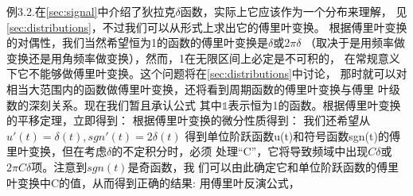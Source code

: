 \documentclass{ctexbook}
\begin{document}
\noindent 例3.2.在\ref{sec:signal}中介绍了狄拉克$\delta$函数，实际上它应该作为一个分布来理解，
见\ref{sec:distributions}，不过我们可以从形式上求出它的傅里叶变换。
根据傅里叶变换的对偶性，我们当然希望恒为1的函数的傅里叶变换是$\delta$或$2\pi\delta$
（取决于是用频率做变换还是用角频率做变换），然而，1在无限区间上必定是不可积的，
在常规意义下它不能够做傅里叶变换。这个问题将在\ref{sec:distributions}中讨论，
那时就可以对相当大范围内的函数做傅里叶变换，还将看到周期函数的傅里叶变换与傅里
叶级数的深刻关系。现在我们暂且承认公式
其中$\mathds{1}$表示恒为1的函数。根据傅里叶变换的平移定理，立即得到：
根据傅里叶变换的微分性质得到：
我们还希望从$u'(t)=\delta(t),sgn'(t)=2\delta(t)$
得到单位阶跃函数u(t)和符号函数sgn(t)的傅里叶变换，但在考虑$\delta$的不定积分时，必须
处理“C”，它将导致频域中出现$C\delta$或$2\pi C\delta$项。注意到$sgn(t)$是奇函数，我
们可以由此确定它和单位阶跃函数的傅里叶变换中C的值，从而得到正确的结果:
用傅里叶反演公式，
\end{document}
